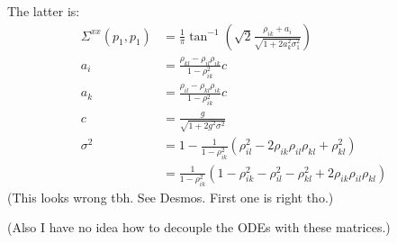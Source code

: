 \documentclass{article}
\begin{document}
The latter is:
\begin{align}
  \Sigma^{xx}(p_1,p_1) &= \frac{1}{\pi} \tan^{-1} \left( \sqrt{2} \frac{\rho_{ik} + a_i}{\sqrt{1 + 2 a_k^2 \sigma_1^2}} \right) \\
  a_i &= \frac{ \rho_{kl} - \rho_{il} \rho_{ik} }{ 1 - \rho_{ik}^2 } c \\
  a_k &= \frac{ \rho_{il} - \rho_{kl} \rho_{ik} }{ 1 - \rho_{ik}^2 } c \\
  c &= \frac{g}{\sqrt{1 + 2 g^2 \sigma^2}} \\
  \sigma^2 &= 1 - \frac{1}{1-\rho_{ik}^2} \left( \rho_{il}^2 - 2 \rho_{ik} \rho_{il} \rho_{kl} + \rho_{kl}^2 \right) \\
  &= \frac{1}{1-\rho_{ik}^2} \left( 1 - \rho_{ik}^2 - \rho_{il}^2 - \rho_{kl}^2 + 2 \rho_{ik} \rho_{il} \rho_{kl} \right)
\end{align}
(This looks wrong tbh. See Desmos. First one is right tho.)

(Also I have no idea how to decouple the ODEs with these matrices.)
\end{document}
